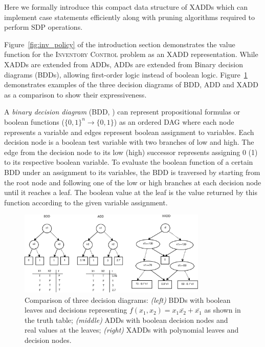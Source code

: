 \documentclass[twoside,11pt]{article}
\newcommand{\InventoryControl}{\textsc{Inventory Control }}
\begin{document}
Here we formally introduce this compact data structure of XADDs which can implement case statements efficiently along with pruning algorithms required to perform SDP operations.
 
 Figure~\ref{fig:inv_policy} of the introduction section demonstrates the value function for the \InventoryControl problem as an XADD representation. While XADDs are extended from ADDs, ADDs are extended from Binary decision diagrams (BDDs), allowing first-order logic instead of boolean logic. Figure~\ref{fig:bdd_add_xadd} demonstrates examples of the three decision diagrams of BDD, ADD and XADD as a comparison to show their expressiveness.   

A \emph{binary decision diagram} (BDD, \cite{bryant}) can represent propositional formulas or boolean functions ($\lbrace 0,1\rbrace^n \rightarrow \lbrace 0,1\rbrace$) as an ordered DAG where each node represents a variable and edges represent boolean assignment to  variables. Each decision node is a boolean test variable with two branches of low and high. The edge from the decision node to its low (high) successor represents assigning 0 (1) to its respective boolean variable. To evaluate the boolean function of a certain BDD under an assignment to its variables, the BDD is traversed by starting from the root node and following one of the low or high branches at each decision node until it reaches a leaf. The boolean value at the leaf is the value returned by this function according to the given variable assignment. 

\begin{figure}[t!]
\centering
\includegraphics[width=0.8\textwidth]{pics/bdd_add_xadd.pdf}
\vspace{-1mm}

\caption{%
Comparison of three decision diagrams: {\it (left)} BDDs with boolean leaves and decisions representing $f(x_1,x_2) = x_1\bar{x_2}+\bar{x_1}$ as shown in the truth table; {\it (middle)} ADDs with  boolean decision nodes and real values at the leaves; {\it (right)} XADDs with polynomial leaves and decision nodes.}
\label{fig:bdd_add_xadd}
\end{figure}
\end{document}
